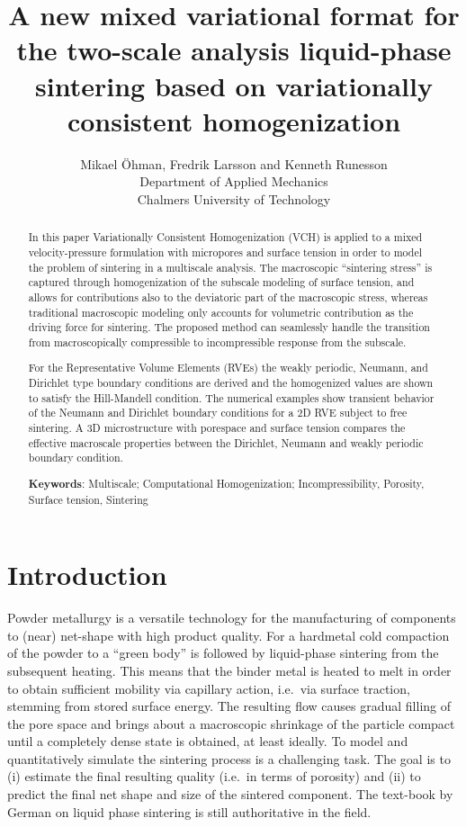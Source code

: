 \documentclass[12pt,a4paper]{article}
\title{A new mixed variational format for the two-scale analysis liquid-phase sintering based on variationally consistent homogenization}
\author{
Mikael Öhman, Fredrik Larsson and Kenneth Runesson\\
Department of Applied Mechanics \\
Chalmers University of Technology}
\begin{document}
\maketitle
\begin{abstract}
In this paper Variationally Consistent Homogenization (VCH) is applied to a mixed velocity-pressure formulation with micropores and surface tension in order to model the problem of sintering in a multiscale analysis.
The macroscopic ``sintering stress'' is captured through homogenization of the subscale modeling of surface tension, and allows for contributions also to the deviatoric part of the macroscopic stress, whereas traditional macroscopic modeling only accounts for volumetric contribution as the driving force for sintering.
The proposed method can seamlessly handle the transition from macroscopically compressible to incompressible response from the subscale.

For the Representative Volume Elements (RVEs) the weakly periodic, Neumann, and Dirichlet type boundary conditions are derived and the homogenized values are shown to satisfy the Hill-Mandell condition.
The numerical examples show transient behavior of the Neumann and Dirichlet boundary conditions for a 2D RVE subject to free sintering.
A 3D microstructure with porespace and surface tension compares the effective macroscale properties between the Dirichlet, Neumann and weakly periodic boundary condition.


\textbf{Keywords}:
Multiscale; Computational Homogenization; Incompressibility, Porosity, Surface tension, Sintering
\end{abstract}

\section{Introduction}
Powder metallurgy is a versatile technology for the manufacturing of components to (near) net-shape with high product quality.
For a hardmetal cold compaction of the powder to a ``green body'' is followed by liquid-phase sintering from the subsequent heating.
This means that the binder metal is heated to melt in order to obtain sufficient mobility via capillary action, i.e.\ via surface traction, stemming from stored surface energy.
The resulting flow causes gradual filling of the pore space and brings about a macroscopic shrinkage of the particle compact until a completely dense state is obtained, at least ideally.
To model and quantitatively simulate the sintering process is a challenging task.
The goal is to (i) estimate the final resulting quality (i.e.\ in terms of porosity) and (ii) to predict the final net shape and size of the sintered component.
The text-book by German \cite{german_sintering_1996} on liquid phase sintering is still authoritative in the field.
\end{document}
